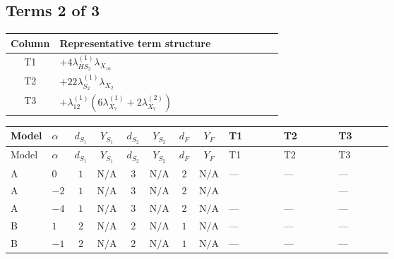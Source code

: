 \documentclass[8pt]{article}
\begin{document}
\begin{landscape}
\subsection*{Terms 2 of 3}
\begin{center}
\begin{tabular}{@{}c >{\raggedright\arraybackslash}p{0.82\linewidth}@{}}
\toprule
Column & Representative term structure \\
\midrule
T1 & \(\displaystyle +4 {\lambda_{HS_2}^{(1)}} {\lambda_{X_{16}}}\) \\
\midrule
T2 & \(\displaystyle +22 {\lambda_{S_2}^{(1)}} {\lambda_{X_{2}}}\) \\
\midrule
T3 & \(\displaystyle +{\lambda_{12}^{(1)}} (6 {\lambda_{X_{7}}^{(1)}}+2 {\lambda_{X_{7}}^{(2)}})\) \\
\midrule
\bottomrule
\end{tabular}
\end{center}
\smallskip
\tiny
\begin{longtable}{@{}llcccccc >{\raggedright\arraybackslash}p{0.21\linewidth} >{\raggedright\arraybackslash}p{0.21\linewidth} >{\raggedright\arraybackslash}p{0.21\linewidth}@{}}
\toprule
Model & $\alpha$ & $d_{S_1}$ & $Y_{S_1}$ & $d_{S_2}$ & $Y_{S_2}$ & $d_F$ & $Y_F$ & T1 & T2 & T3 \\
\midrule
\endfirsthead
\toprule
Model & $\alpha$ & $d_{S_1}$ & $Y_{S_1}$ & $d_{S_2}$ & $Y_{S_2}$ & $d_F$ & $Y_F$ & T1 & T2 & T3 \\
\midrule
\endhead
A & $0$ & $1$ & $\text{N/A}$ & $3$ & $\text{N/A}$ & $2$ & $\text{N/A}$ & --- & --- & --- \\
\midrule
A & $-2$ & $1$ & $\text{N/A}$ & $3$ & $\text{N/A}$ & $2$ & $\text{N/A}$ & \scriptsize\adjustbox{max width=\linewidth}{$\begin{gathered} +4 {\lambda_{HS_2}^{(1)}} {\lambda_{X_{16}}}\end{gathered}$} & \scriptsize\adjustbox{max width=\linewidth}{$\begin{gathered} +22 {\lambda_{S_2}^{(1)}} {\lambda_{X_{2}}}\end{gathered}$} & --- \\
\midrule
A & $-4$ & $1$ & $\text{N/A}$ & $3$ & $\text{N/A}$ & $2$ & $\text{N/A}$ & --- & --- & --- \\
\midrule
B & $1$ & $2$ & $\text{N/A}$ & $2$ & $\text{N/A}$ & $1$ & $\text{N/A}$ & --- & --- & --- \\
\midrule
B & $-1$ & $2$ & $\text{N/A}$ & $2$ & $\text{N/A}$ & $1$ & $\text{N/A}$ & --- & --- & --- \\

\end{longtable}
\end{landscape}
\end{document}
